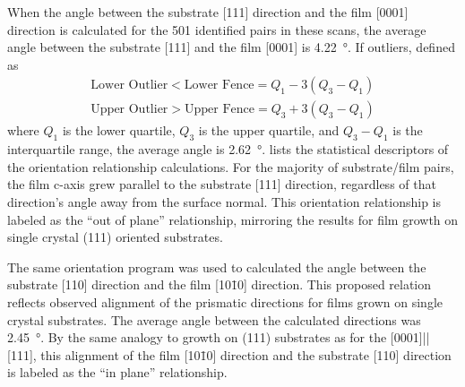 %	
%		
%		
%		
%		
%		
%		
%		
%		
When the angle between the substrate [111] direction and the film [0001] direction is calculated for the 501 identified pairs in these scans, the average angle between the substrate [111] and the film [0001] is \SI{4.22}{\degree}. If outliers, defined as
\begin{gather}
\text{Lower Outlier} < \text{Lower Fence} = Q_{1}-3(Q_{3}-Q_{1})\\
\text{Upper Outlier} > \text{Upper Fence}=  Q_{3}+3(Q_{3}-Q_{1})
\end{gather}
where $Q_{1}$ is the lower quartile, $Q_{3}$ is the upper quartile, and $Q_{3}-Q_{1}$ is the interquartile range, the average angle is \SI{2.62}{\degree}.  lists the statistical descriptors of the orientation relationship calculations. For the majority of substrate/film pairs, the film c-axis grew parallel to the substrate [111] direction, regardless of that direction's angle away from the surface normal. This orientation relationship is labeled as the ``out of plane'' relationship, mirroring the results for film growth on single crystal (111) oriented \sto substrates.

The same orientation program was used to calculated the angle between the substrate [110] direction and the film [10\={1}0] direction. This proposed relation reflects observed alignment of the prismatic directions for films grown on single crystal substrates. The average angle between the calculated directions was \SI{2.45}{\degree}. By the same analogy to growth on \sto (111) substrates as for the [0001]||[111], this alignment of the film [10\={1}0] direction and the substrate [110] direction is labeled as the ``in plane'' relationship.

